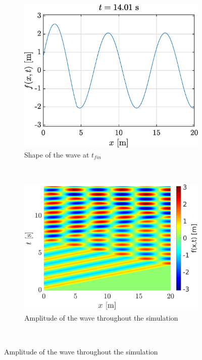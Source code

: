 \documentclass[a4paper,12pt,twoside]{article}
\begin{document}
    \begin{figure}[h!]
    \begin{subfigure}{0.5\textwidth}
    \includegraphics[width=\textwidth]{graphs/ex1flibre.eps}
    \caption{Shape of the wave at $t_{fin}$}
    \label{fig:ex1libf}
    \end{subfigure}
    ~
    \begin{subfigure}{0.55\textwidth}
    \includegraphics[width=\textwidth]{graphs/ex1xtlibre.eps}
    \caption{Amplitude of the wave throughout the simulation}
    \label{fig:ex1libxt}
    \end{subfigure}\


\end{figure}
\end{document}

